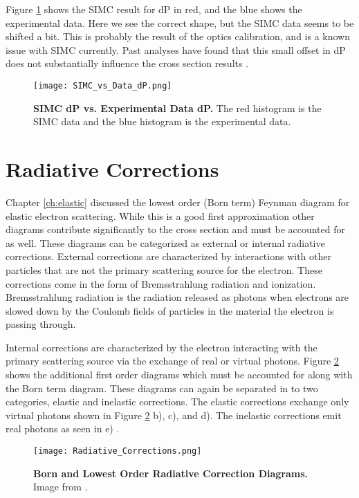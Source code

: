 Figure \ref{fig:simc_dp} shows the SIMC result for dP in red, and the blue shows the experimental data. Here we see the correct shape, but the SIMC data seems to be shifted a bit. This is probably the result of the optics calibration, and is a known issue with SIMC currently. Past analyses have found that this small offset in dP does not substantially influence the cross section results \cite{dien}.

\begin{figure}[!ht]
\begin{center}
\texttt{[image: SIMC\_vs\_Data\_dP.png]}
\end{center}
\caption[SIMC dP vs. Experimental Data dP]{
{\bf{SIMC dP vs. Experimental Data dP.}} The red histogram is the SIMC data and the blue histogram is the experimental data.}
\label{fig:simc_dp}
\end{figure}

\section{Radiative Corrections}
\label{sec:rc}

Chapter \ref{ch:elastic} discussed the lowest order (Born term) Feynman diagram for elastic electron scattering. While this is a good first approximation other diagrams contribute significantly to the cross section and must be accounted for as well. These diagrams can be categorized as external or internal radiative corrections. External corrections are characterized by interactions with other particles that are not the primary scattering source for the electron. These corrections come in the form of Bremsstrahlung radiation and ionization. Bremsstrahlung radiation is the radiation released as photons when electrons are slowed down by the Coulomb fields of particles in the material the electron is passing through. 

Internal corrections are characterized by the electron interacting with the primary scattering source via the exchange of real or virtual photons. Figure \ref{fig:rc} shows the additional first order diagrams which must be accounted for along with the Born term diagram. These diagrams can again be separated in to two categories, elastic and inelastic corrections. The elastic corrections exchange only virtual photons shown in Figure \ref{fig:rc} b), c), and d). The inelastic corrections emit real photons as seen in e) \cite{Thesis:Wang}.

\begin{figure}[!ht]
\begin{center}
\texttt{[image: Radiative\_Corrections.png]}
\end{center}
\caption[Born and Lowest Order Radiative Correction Diagrams]{
{\bf{Born and Lowest Order Radiative Correction Diagrams.}} Image from \cite{Thesis:Wang}.}
\label{fig:rc}
\end{figure}

